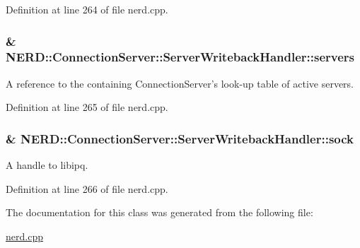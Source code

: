 \-Definition at line 264 of file nerd.\-cpp.

\hypertarget{classNERD_1_1ConnectionServer_1_1ServerWritebackHandler_aa08d6aaad29ae5ece57c9f0623803e06}{
\subsubsection[{servers}]{\& {\bf \-N\-E\-R\-D\-::\-Connection\-Server\-::\-Server\-Writeback\-Handler\-::servers}}}
\label{classNERD_1_1ConnectionServer_1_1ServerWritebackHandler_aa08d6aaad29ae5ece57c9f0623803e06}


\-A reference to the containing \-Connection\-Server's look-\/up table of active servers. 



\-Definition at line 265 of file nerd.\-cpp.

\hypertarget{classNERD_1_1ConnectionServer_1_1ServerWritebackHandler_a452352f53ba0bf33d1a4be562bd1f490}{
\subsubsection[{sock}]{\& {\bf \-N\-E\-R\-D\-::\-Connection\-Server\-::\-Server\-Writeback\-Handler\-::sock}}}
\label{classNERD_1_1ConnectionServer_1_1ServerWritebackHandler_a452352f53ba0bf33d1a4be562bd1f490}


\-A handle to libipq. 



\-Definition at line 266 of file nerd.\-cpp.



\-The documentation for this class was generated from the following file\-:\begin{DoxyCompactItemize}
\item 
\hyperlink{nerd_8cpp}{nerd.\-cpp}\end{DoxyCompactItemize}
